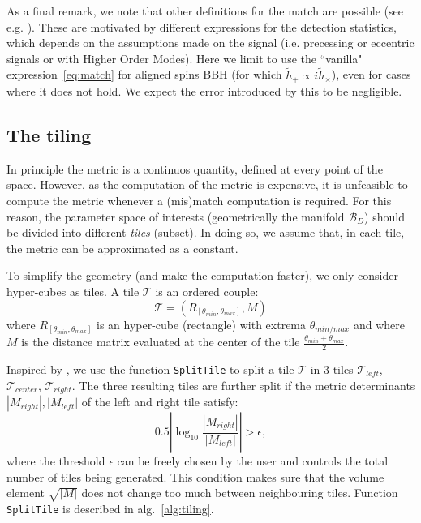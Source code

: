 \documentclass[twocolumn,showpacs,preprintnumbers,nofootinbib,prd,
superscriptaddress,10pt]{revtex4-2}
\begin{document}
As a final remark, we note that other definitions for the match are possible (see e.g. \cite{PhysRevD.94.024012,PhysRevD.97.023004}). These are motivated by different expressions for the detection statistics, which depends on the assumptions made on the signal (i.e. precessing or eccentric signals or with Higher Order Modes). Here we limit to use the ``vanilla" expression~\eqref{eq:match} for aligned spins BBH (for which $\tilde{h}_+ \propto i \tilde{h}_\times$), even for cases where it does not hold. We expect the error introduced by this to be negligible.

\subsection{The tiling} \label{sec:tiling}

In principle the metric is a continuos quantity, defined at every point of the space. However, as the computation of the metric is expensive, it is unfeasible to compute the metric whenever a (mis)match computation is required.
For this reason, the parameter space of interests (geometrically the manifold $\mathcal{B}_D$) should be divided into different {\it tiles} (subset). In doing so, we assume that, in each tile, the metric can be approximated as a constant.

To simplify the geometry (and make the computation faster), we only consider hyper-cubes as tiles. A tile $\mathcal{T}$ is an ordered couple:
\begin{equation} \label{eq:tile}
	\mathcal{T} = \left(R_{[\theta_{min}, \theta_{max}]}, M \right)
\end{equation}
where $R_{[\theta_{min}, \theta_{max}]}$ is an hyper-cube (rectangle) with extrema $\theta_{min/max}$ and where $M$ is the distance matrix evaluated at the center of the tile $\frac{\theta_{min}+\theta_{max}}{2}$.

Inspired by \cite{Hanna:2022zpk}, we use the function \texttt{SplitTile} to split a tile $\mathcal{T}$ in 3 tiles $\mathcal{T}_{left}$, $\mathcal{T}_{center}$, $\mathcal{T}_{right}$.
The three resulting tiles are further split if the metric determinants $|M_{right}|, |M_{left}|$ of the left and right tile satisfy:
\begin{equation}
	0.5\left|\log_{\textrm{10}}\frac{|M_{right}|}{|M_{left}|}\right| > \epsilon,
\end{equation}
where the threshold $\epsilon$ can be freely chosen by the user and controls the total number of tiles being generated.
This condition makes sure that the volume element $\sqrt{|M|}$ does not change too much between neighbouring tiles.
Function \texttt{SplitTile} is described in alg.~\ref{alg:tiling}.
\end{document}
